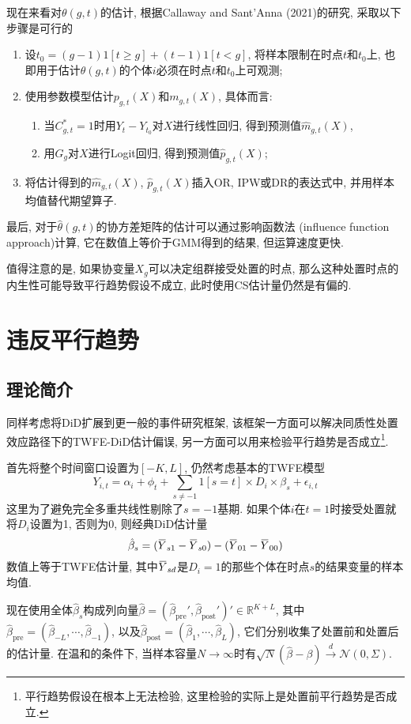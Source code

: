 \documentclass[cn,sakura,14pt,screen,bibstyle=gb7714-2015,math=mtpro2]{elegantnote}
\newcommand{\overbar}[1]{\mkern 1.5mu\overline{\mkern-1.5mu#1\mkern-1.5mu}\mkern 1.5mu}
\begin{document}
现在来看对$\theta(g,t)$的估计, 根据Callaway and Sant'Anna (2021)的研究, 采取以下步骤是可行的
\begin{enumerate}[label=\arabic*.]
  \item 设$t_0=(g-1)1[t\ge g]+(t-1)1[t<g]$, 将样本限制在时点$t$和$t_0$上, 也即用于估计$\theta(g,t)$的个体$i$必须在时点$t$和$t_0$上可观测;
  \item 使用参数模型估计$p_{g,t}(X)$和$m_{g,t}(X)$, 具体而言:
  \begin{enumerate}[label=\alph*.]
    \item 当$C_{g,t}^\ast=1$时用$Y_{t}-Y_{t_0}$对$X$进行线性回归, 得到预测值$\hat{m}_{g,t}(X)$,
    \item 用$G_g$对$X$进行Logit回归, 得到预测值$\hat{p}_{g,t}(X)$;
  \end{enumerate}
  \item 将估计得到的$\hat{m}_{g,t}(X)$, $\hat{p}_{g,t}(X)$插入OR, IPW或DR的表达式中, 并用样本均值替代期望算子.
\end{enumerate}
最后, 对于$\hat{\theta}(g,t)$的协方差矩阵的估计可以通过影响函数法 (influence function approach)计算, 它在数值上等价于GMM得到的结果, 但运算速度更快.

值得注意的是, 如果协变量$X_g$可以决定组群接受处置的时点, 那么这种处置时点的内生性可能导致平行趋势假设不成立, 此时使用CS估计量仍然是有偏的.

\newpage
\section{违反平行趋势}
\subsection{理论简介}
同样考虑将DiD扩展到更一般的事件研究框架, 该框架一方面可以解决同质性处置效应路径下的TWFE-DiD估计偏误, 另一方面可以用来检验平行趋势是否成立\footnote{平行趋势假设在根本上无法检验, 这里检验的实际上是处置前平行趋势是否成立.}.

首先将整个时间窗口设置为$[-K,L]$, 仍然考虑基本的TWFE模型
$$Y_{i,t}=\alpha_i+\phi_t+\sum_{s\ne-1}1[s=t]\times D_i\times\beta_s+\epsilon_{i,t}$$
这里为了避免完全多重共线性剔除了$s=-1$基期. 如果个体$i$在$t=1$时接受处置就将$D_i$设置为1, 否则为0, 则经典DiD估计量
$$\hat{\beta}_s=(\overbar{Y}_{s1}-\overbar{Y}_{s0})-(\overbar{Y}_{01}-\overbar{Y}_{00})$$
数值上等于TWFE估计量, 其中$\overbar{Y}_{sd}$是$D_i=1$的那些个体在时点$s$的结果变量的样本均值.

现在使用全体$\hat{\beta}_s$构成列向量$\hat{\beta}=(\hat{\beta}_{\text{pre}}',\hat{\beta}_{\text{post}}')'\in\mathbb{R}^{K+L}$, 其中$\hat{\beta}_\text{pre}=(\hat{\beta}_{-L},\cdots,\hat{\beta}_{-1})$, 以及$\hat{\beta}_{\text{post}}=(\hat{\beta}_1,\cdots,\hat{\beta}_L)$, 它们分别收集了处置前和处置后的估计量. 在温和的条件下, 当样本容量$N\to\infty$时有$\sqrt{N}(\hat{\beta}-\beta)\xrightarrow{d}\mathcal{N}(0,\Sigma)$.
\end{document}
